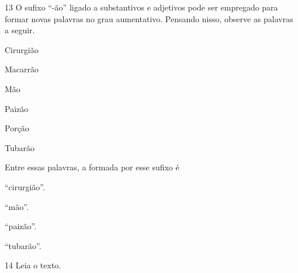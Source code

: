 \num{13} O sufixo ``-ão'' ligado a substantivos e adjetivos pode ser
empregado para formar novas palavras no grau aumentativo. Pensando
nisso, observe as palavras a seguir.

\begin{myquote}
\begin{itemize}
\begin{multicols}{3}
\item[] Cirurgião

\item[] Macarrão

\item[] Mão

\item[] Paizão

\item[] Porção

\item[] Tubarão
\end{multicols}
\end{itemize}
\end{myquote}

Entre essas palavras, a formada por esse sufixo é

\begin{escolha}
\begin{multicols}{2}
\item ``cirurgião''.

\item ``mão''.

\item ``paizão''.

\item ``tubarão''.
\end{multicols}
\end{escolha}


\num{14} Leia o texto.

